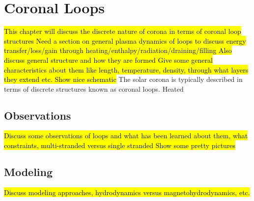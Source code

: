 \chapter{Coronal Loops}
\label{ch:coronal_loops}
\hl{This chapter will discuss the discrete nature of corona in terms of coronal loop structures
Need a section on general plasma dynamics of loops to discuss energy transfer/loss/gain through heating/enthalpy/radiation/draining/filling
Also discuss general structure and how they are formed
Give some general characteristics about them like length, temperature, density, through what layers they extend etc.
Show nice schematic}
The solar corona is typically described in terms of discrete structures known as coronal loops. Heated   
\section{Observations}
\label{sec:observations}
\hl{Discuss some observations of loops and what has been learned about them, what constraints, multi-stranded versus single stranded
Show some pretty pictures}
\section{Modeling}
\label{sec:modeling}
\hl{Discuss modeling approaches, hydrodynamics versus magnetohydrodynamics, etc.}
